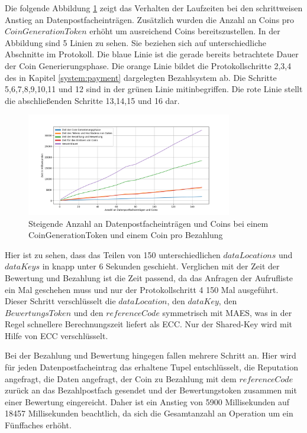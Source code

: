 \documentclass[
	fontsize=12pt,
	headings=small,
	parskip=half,           %
	bibliography=totoc,
	numbers=noenddot,       %
	open=any,               %
]{scrreprt}
\begin{document}
Die folgende Abbildung \ref{fig:win_3} zeigt das Verhalten der Laufzeiten bei den schrittweisen Anstieg an Datenpostfacheinträgen. Zusätzlich wurden die Anzahl an Coins pro $CoinGenerationToken$ erhöht um ausreichend Coins bereitszustellen. In der Abbildung sind 5 Linien zu sehen. Sie beziehen sich auf unterschiedliche Abschnitte im Protokoll. Die blaue Linie ist die gerade bereits betrachtete Dauer der Coin Generierungsphase. Die orange Linie bildet die Protokollschritte 2,3,4 des in Kapitel \ref{system:payment} dargelegten Bezahlsystem ab. Die Schritte 5,6,7,8,9,10,11 und 12 sind in der grünen Linie mitinbegriffen. Die rote Linie stellt die abschließenden Schritte 13,14,15 und 16 dar.
\begin{figure}[H]
    \caption{Steigende Anzahl an Datenpostfacheinträgen und Coins bei einem CoinGenerationToken und einem Coin pro Bezahlung}
    \label{fig:win_3}
    \centering
    \includegraphics[width=0.8\textwidth]{figure_win_3.png}
\end{figure}
Hier ist zu sehen, dass das Teilen von 150 unterschiedlichen $dataLocations$ und $dataKeys$ in knapp unter 6 Sekunden geschieht. Verglichen mit der Zeit der Bewertung und Bezahlung ist die Zeit passend, da das Anfragen der Aufrufliste ein Mal geschehen muss und nur der Protokollschritt 4 150 Mal ausgeführt. Dieser Schritt verschlüsselt die $dataLocation$, den $dataKey$, den $BewertungsToken$ und den $referenceCode$ symmetrisch mit MAES, was in der Regel schnellere Berechnungszeit liefert als ECC. Nur der Shared-Key wird mit Hilfe von ECC verschlüsselt. 

Bei der Bezahlung und Bewertung hingegen fallen mehrere Schritt an. Hier wird für jeden Datenpostfacheintrag das erhaltene Tupel entschlüsselt, die Reputation angefragt, die Daten angefragt, der Coin zu Bezahlung mit dem $referenceCode$ zurück an das Bezahlpostfach gesendet und der Bewertungstoken zusammen mit einer Bewertung eingereicht. Daher ist ein Anstieg von 5900 Millisekunden auf 18457 Millisekunden beachtlich, da sich die Gesamtanzahl an Operation um ein Fünffaches erhöht. 
\end{document}
